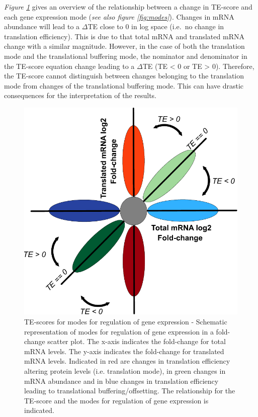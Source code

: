 \documentclass[
  12pt,
  openany]{book}
\begin{document}
\emph{Figure \ref{fig:TE}} gives an overview of the relationship between a change in TE-score and each gene expression mode (\emph{see also figure \ref{fig:modes}}). Changes in mRNA abundance will lead to a \(\varDelta\)TE close to 0 in log space (i.e.~no change in translation efficiency). This is due to that total mRNA and translated mRNA change with a similar magnitude. However, in the case of both the translation mode and the translational buffering mode, the nominator and denominator in the TE-score equation change leading to a \(\varDelta\)TE (TE \textless{} 0 or TE \textgreater{} 0). Therefore, the TE-score cannot distinguish between changes belonging to the translation mode from changes of the translational buffering mode. This can have drastic consequences for the interpretation of the results.
\clearpage

\begin{figure}
  \includegraphics{./figures/geneModes_TE.pdf}
  \caption{TE-scores for modes for regulation of gene expression -  Schematic representation of modes for regulation of gene expression in a fold-change scatter plot. The x-axis indicates the fold-change for total mRNA levels. The y-axis indicates the fold-change for translated mRNA levels. Indicated in red are changes in translation efficiency altering protein levels (i.e. translation mode), in green changes in mRNA abundance and in blue changes in translation efficiency leading to translational buffering/offsetting. The relationship for the TE-score and the modes for regulation of gene expression is indicated. \label{fig:TE}}
\end{figure}
\end{document}
